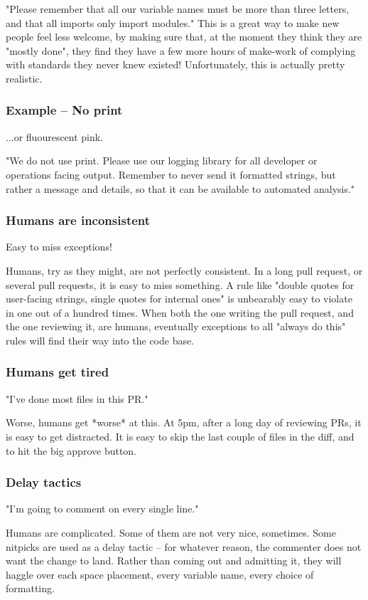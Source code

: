 "Please remember that all our variable names must be more than
three letters,
and that all imports only import modules."
This is a great way to make new people feel less welcome,
by making sure that,
at the moment they think they are "mostly done",
they find they have a few more hours of make-work
of complying with standards they never knew existed!
Unfortunately, this is actually pretty realistic.

\begin{frame}
\frametitle{Example -- No print}
...or fluourescent pink.
\end{frame}

"We do not use print.
Please use our logging library for all developer or operations facing
output.
Remember to never send it formatted strings,
but rather a message and details,
so that it can be available to automated analysis."

\begin{frame}
\frametitle{Humans are inconsistent}
Easy to miss exceptions!
\end{frame}

Humans,
try as they might,
are not perfectly consistent.
In a long pull request,
or several pull requests,
it is easy to miss something.
A rule like
"double quotes for user-facing strings,
single quotes for internal ones"
is unbearably easy to violate in one out of a hundred times.
When both the one writing the pull request,
and the one reviewing it,
are humans,
eventually exceptions to all "always do this"
rules will find their way into the code base.

\begin{frame}
\frametitle{Humans get tired}
"I've done most files in this PR."
\end{frame}

Worse,
humans get *worse* at this.
At 5pm,
after a long day of reviewing PRs,
it is easy to get distracted.
It is easy to skip the last couple of files
in the diff,
and to hit the big approve button.

\begin{frame}
\frametitle{Delay tactics}
"I'm going to comment on every single line."
\end{frame}

Humans are complicated.
Some of them are not very nice,
sometimes.
Some nitpicks are used as a delay tactic --
for whatever reason,
the commenter does not want the change to land.
Rather than coming out and admitting it,
they will haggle over each space placement,
every variable name,
every choice of formatting.

